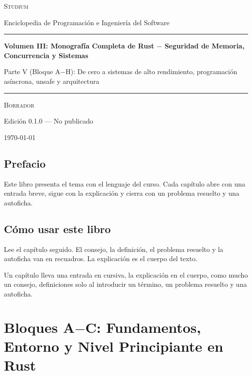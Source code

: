\documentclass{book}
\begin{document}
\frontmatter
\thispagestyle{empty}
\setlength{\parindent}{0pt}
\vspace*{0.08\textheight}
{\normalsize\scshape\color{studiumInk} Studium\par}
{\small Enciclopedia de Programación e Ingeniería del Software\par}
\vspace{0.55em}
{\color{studiumRule}\rule{\linewidth}{0.9pt}\par}
\vspace{0.16\textheight}
{\raggedright\Huge\bfseries Volumen III: Monografía Completa de Rust \(-\) Seguridad de Memoria, Concurrencia y Sistemas\par}
\vspace{0.9em}
{\raggedright\Large\color{studiumInk} Parte V (Bloque A\(-\)H): De cero a sistemas de alto rendimiento, programación asíncrona, unsafe y arquitectura\par}
\vfill
{\color{studiumRule}\rule{0.36\linewidth}{0.45pt}\par}
\vspace{1.05em}
{\large\scshape Borrador\par}
\vspace{0.45em}
{\normalsize Edición 0.1.0 --- No publicado\par}
\vspace{0.4em}
{\normalsize\today\par}
\vspace*{0.08\textheight}
\clearpage
\chapter{Prefacio}
\noindent Este libro presenta el tema con el lenguaje del curso. Cada capítulo abre con una entrada breve, sigue con la explicación y cierra con un problema resuelto y una autoficha.
\chapter{Cómo usar este libro}
\noindent Lee el capítulo seguido. El consejo, la definición, el problema resuelto y la autoficha van en recuadros. La explicación es el cuerpo del texto.

\noindent Un capítulo lleva una entrada en cursiva, la explicación en el cuerpo, como mucho un consejo, definiciones solo al introducir un término, un problema resuelto y una autoficha.
\tableofcontents
\mainmatter

\part{Bloques A\(-\)C: Fundamentos, Entorno y Nivel Principiante en Rust}
\end{document}
